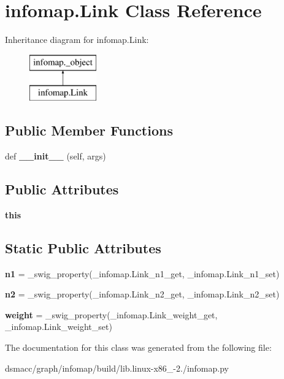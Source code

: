 \hypertarget{classinfomap_1_1Link}{}\section{infomap.\+Link Class Reference}
\label{classinfomap_1_1Link}
Inheritance diagram for infomap.\+Link\+:\begin{figure}[H]
\begin{center}
\leavevmode
\includegraphics[height=2.000000cm]{classinfomap_1_1Link}
\end{center}
\end{figure}
\subsection*{Public Member Functions}
\begin{DoxyCompactItemize}
\item 
\mbox{\label{classinfomap_1_1Link_a6ff3a6cb0d98ec917fc54d0923d2f468}} 
def {\bfseries \+\_\+\+\_\+init\+\_\+\+\_\+} (self, args)
\end{DoxyCompactItemize}
\subsection*{Public Attributes}
\begin{DoxyCompactItemize}
\item 
\mbox{\label{classinfomap_1_1Link_a445ed0fe1d707e89ca6e9f41c296949f}} 
{\bfseries this}
\end{DoxyCompactItemize}
\subsection*{Static Public Attributes}
\begin{DoxyCompactItemize}
\item 
\mbox{\label{classinfomap_1_1Link_aa0b97eafaf876b590884f24a9f2e48dd}} 
{\bfseries n1} = \+\_\+swig\+\_\+property(\+\_\+infomap.\+Link\+\_\+n1\+\_\+get, \+\_\+infomap.\+Link\+\_\+n1\+\_\+set)
\item 
\mbox{\label{classinfomap_1_1Link_aee07f105c0d2d7cf456f99438268e527}} 
{\bfseries n2} = \+\_\+swig\+\_\+property(\+\_\+infomap.\+Link\+\_\+n2\+\_\+get, \+\_\+infomap.\+Link\+\_\+n2\+\_\+set)
\item 
\mbox{\label{classinfomap_1_1Link_af46ea176f73fa24e12118d6f368a51a7}} 
{\bfseries weight} = \+\_\+swig\+\_\+property(\+\_\+infomap.\+Link\+\_\+weight\+\_\+get, \+\_\+infomap.\+Link\+\_\+weight\+\_\+set)
\end{DoxyCompactItemize}


The documentation for this class was generated from the following file\+:\begin{DoxyCompactItemize}
\item 
dsmacc/graph/infomap/build/lib.\+linux-\/x86\+\_-\/2./infomap.\+py\end{DoxyCompactItemize}
